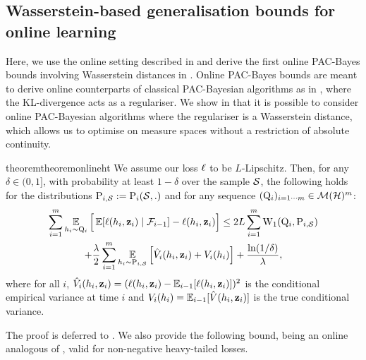 \subsection{Wasserstein-based generalisation bounds for online learning}
\label{sec:wasserstein-online}
Here, we use the online setting described in  and derive the first online PAC-Bayes bounds involving Wasserstein distances in . 
Online PAC-Bayes bounds are meant to derive online counterparts of classical PAC-Bayesian algorithms as in , where the KL-divergence acts as a regulariser.
We show in   that it is possible to consider online PAC-Bayesian algorithms where the regulariser is a Wasserstein distance, which allows us to optimise on measure spaces without a restriction of absolute continuity.

\begin{restatable}{theorem}{theoremonlineht}\label{theorem:online-ht}
 We assume our loss $\loss$ to be $L$-Lipschitz.
Then, for any $\delta\in(0,1]$, with probability at least $1-\delta$ over the sample $\S$, the following holds for the distributions $\P_{i,\S}\defeq \P_i(\S,.)$ and for any sequence $(\Q_i)_{i=1\cdots m}\in\Mcal(\H)^m$:
\begin{multline*}
\sum_{i=1}^m \EE_{h_i\sim \Q_{i}} \Big[\EE[\loss(h_i,\z_i) \mid \Fcal_{i-1}] - \loss(h_i,\z_i) \Big]  \le 2L\sum_{i=1}^{m}\W_{1}(\Q_{i}, \P_{i,\S}) \\
+ \frac{\lambda}{2}\sum_{i=1}^m \EE_{h_i\sim \P_{i,\S}}\left[ \Vhat_i(h_i,\z_i) + V_i(h_i) \right]+\frac{\ln(1/\delta)}{\lambda}, 
\end{multline*}
where for all $i$, $\Vhat_i(h_i,\z_i)= (\loss(h_i,\z_i)-\EE_{i-1}[\loss(h_i,\z_i)])^2$ is the conditional empirical variance at time $i$ and $V_i(h_i)= \EE_{i-1}[\Vhat(h_i,\z_i)]$ is the true conditional variance.
\end{restatable}

The proof is deferred to .
We also provide the following bound, being an online analogous of , valid for non-negative heavy-tailed losses.


